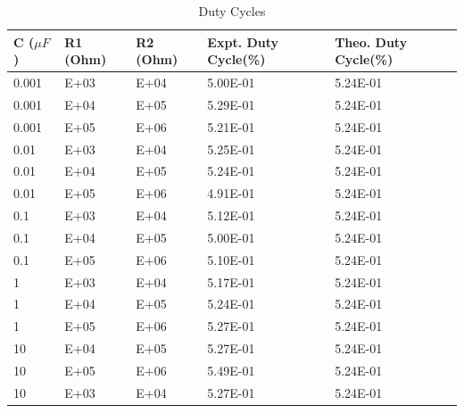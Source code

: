 \documentclass{scrartcl}
\newcommand{\1}{\mathbbm{1}}
\begin{document}
\begin{table}[H]
    \centering
    \begin{tabular}{|l|l|l|l|l|}
    \hline
        \textbf{C ($\mu F$)} & \textbf{R1 (Ohm)} & \textbf{R2 (Ohm)} & \textbf{Expt. Duty Cycle(\%)} & \textbf{Theo. Duty Cycle(\%)}\\ \hline
        0.001 & \num{E+03} & \num{E+04}  & \num{5.00E-01} & \num{5.24E-01}            \\
        0.001 & \num{E+04} & \num{E+05}  & \num{5.29E-01} & \num{5.24E-01}            \\
        0.001 & \num{E+05} & \num{E+06}  & \num{5.21E-01} & \num{5.24E-01}            \\ \hline
        0.01  & \num{E+03} & \num{E+04}   & \num{5.25E-01} & \num{5.24E-01}           \\
        0.01  & \num{E+04} & \num{E+05}   & \num{5.24E-01} & \num{5.24E-01}           \\
        0.01  & \num{E+05} & \num{E+06}   & \num{4.91E-01} & \num{5.24E-01}           \\ \hline
        0.1   & \num{E+03} & \num{E+04}    & \num{5.12E-01} & \num{5.24E-01}          \\
        0.1   & \num{E+04} & \num{E+05}    & \num{5.00E-01} & \num{5.24E-01}          \\
        0.1   & \num{E+05} & \num{E+06}    & \num{5.10E-01} & \num{5.24E-01}          \\ \hline
        1     & \num{E+03} & \num{E+04}      & \num{5.17E-01} & \num{5.24E-01}        \\
        1     & \num{E+04} & \num{E+05}      & \num{5.24E-01} & \num{5.24E-01}        \\
        1     & \num{E+05} & \num{E+06}      & \num{5.27E-01} & \num{5.24E-01}        \\ \hline
        10    & \num{E+04} & \num{E+05}     & \num{5.27E-01} & \num{5.24E-01}         \\
        10    & \num{E+05} & \num{E+06}     & \num{5.49E-01} & \num{5.24E-01}         \\
        10    & \num{E+03} & \num{E+04}  & \num{5.27E-01} & \num{5.24E-01}      \\\hline
    \end{tabular}
    \caption{Duty Cycles}
\end{table}
\end{document}
